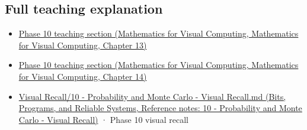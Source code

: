 \subsection{Full teaching explanation}\label{appendix-6a7869dd79a6-full-teaching-explanation}

\begin{itemize}
\tightlist
\item
  \href{../02-Mathematics-for-Visual-Computing/main.pdf\#nameddest=02-foundations-ii-ch029-a-computer-produces-deterministic-pseudorandom-sequences}{Phase 10 teaching section (Mathematics for Visual Computing, Mathematics for Visual Computing, Chapter 13)}
\item
  \href{../02-Mathematics-for-Visual-Computing/main.pdf\#nameddest=02-foundations-ii-ch030-monte-carlo-estimates-trade-computation-for-uncertainty}{Phase 10 teaching section (Mathematics for Visual Computing, Mathematics for Visual Computing, Chapter 14)}
\item
  \href{../01-Bits-Programs-and-Reliable-Systems/main.pdf\#nameddest=appendix-cb5af353ef77}{Visual Recall/10 - Probability and Monte Carlo - Visual Recall.md (Bits, Programs, and Reliable Systems, Reference notes: 10 - Probability and Monte Carlo - Visual Recall)} · Phase 10 visual recall
\end{itemize}
